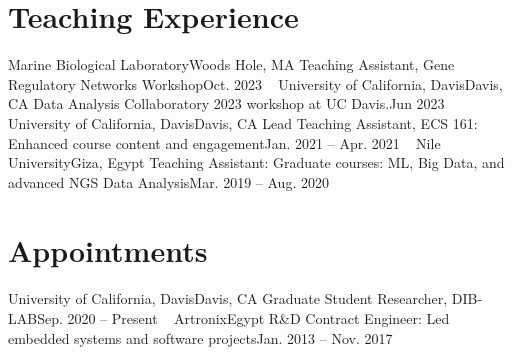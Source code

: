   \section{Teaching Experience}
  \resumeSubHeadingListStart
  \resumeSubheading
  {Marine Biological Laboratory}{Woods Hole, MA}
  {Teaching Assistant, Gene Regulatory Networks Workshop}{Oct. 2023}
\
    \resumeSubheading
    {University of California, Davis}{Davis, CA}
    {Data Analysis Collaboratory 2023 workshop at UC Davis.}{Jun 2023}
\
    \resumeSubheading
      {University of California, Davis}{Davis, CA}
      {Lead Teaching Assistant, ECS 161: Enhanced course content and engagement}{Jan. 2021 -- Apr. 2021}
\ 
    \resumeSubheading
      {Nile University}{Giza, Egypt}
      {Teaching Assistant: Graduate courses: ML, Big Data, and advanced NGS Data Analysis}{Mar. 2019 -- Aug. 2020}
  
  \resumeSubHeadingListEnd

\section{Appointments}
  \resumeSubHeadingListStart

    \resumeSubheading
      {University of California, Davis}{Davis, CA}
      {Graduate Student Researcher, DIB-LAB}{Sep. 2020 -- Present}
\
    \resumeSubheading
      {Artronix}{Egypt}
      {R\&D Contract Engineer: Led embedded systems and software projects}{Jan. 2013 -- Nov. 2017}

  \resumeSubHeadingListEnd



